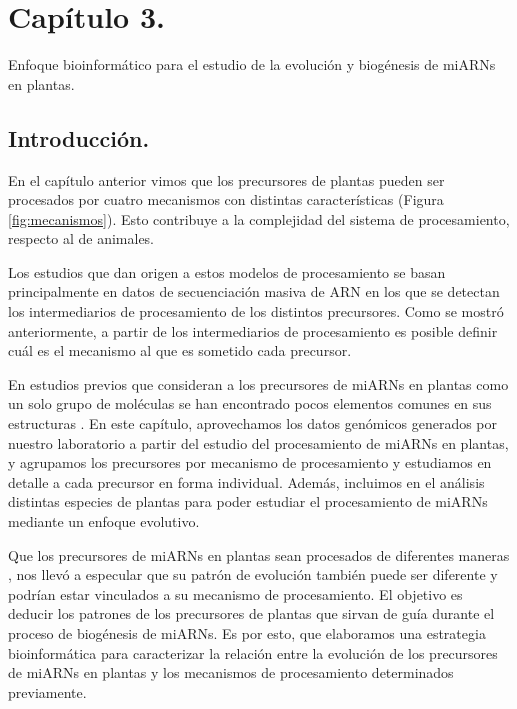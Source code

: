 
\graphicspath{{Chapter3/Figs/}}

\setcounter{chapter}{6}
\chapter*{Capítulo 3.} 
\setcounter{figure}{0}
\setcounter{table}{0}
\setcounter{section}{0}

{\LARGE Enfoque bioinformático para el estudio de la evolución y biogénesis de miARNs en plantas.}


\section{Introducción.}

En el capítulo anterior vimos que los precursores de plantas pueden ser procesados por cuatro mecanismos con distintas características (Figura \ref{fig:mecanismos}).
Esto contribuye a la complejidad del sistema de procesamiento, respecto al de animales.

Los estudios que dan origen a estos modelos de procesamiento se basan principalmente en datos de secuenciación masiva de ARN en los que se detectan los intermediarios de procesamiento de los distintos precursores.
Como se mostró anteriormente, a partir de los intermediarios de procesamiento es posible definir cuál es el mecanismo al que es sometido cada precursor.

En estudios previos que consideran a los precursores de miARNs en plantas como un solo grupo de moléculas se han encontrado pocos elementos comunes en sus estructuras \citep{Mateos2010}.
En este capítulo, aprovechamos los datos genómicos generados por nuestro laboratorio a partir del estudio del procesamiento de miARNs en plantas, y agrupamos los precursores por mecanismo de procesamiento y estudiamos en detalle a cada precursor en forma individual.
Además, incluimos en el análisis distintas especies de plantas para poder estudiar el procesamiento de miARNs mediante un enfoque evolutivo.

Que los precursores de miARNs en plantas sean procesados de diferentes maneras \citep{Bologna2013}, nos llevó a especular que su patrón de evolución también puede ser diferente y podrían estar vinculados a su mecanismo de procesamiento.
El objetivo es deducir los patrones de los precursores de plantas que sirvan de guía durante el proceso de biogénesis de miARNs.
Es por esto, que elaboramos una estrategia bioinformática para caracterizar la relación entre la evolución de los precursores de miARNs en plantas y los mecanismos de procesamiento determinados previamente.

